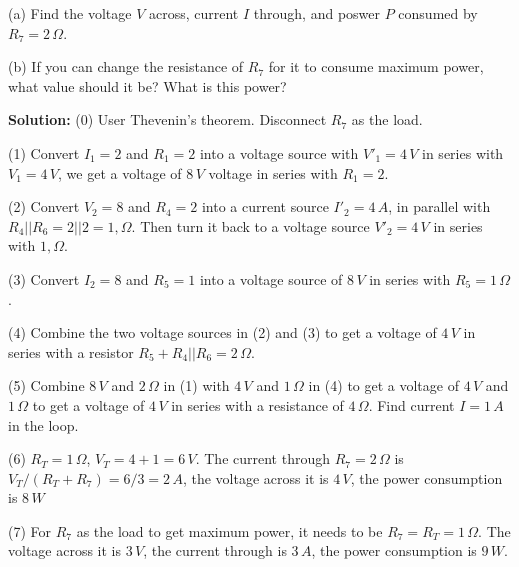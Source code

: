   (a) Find the voltage $V$ across, current $I$ through, and poswer
  $P$ consumed by $R_7=2\,\Omega$.
  

  (b) If you can change the resistance of $R_7$ for it to consume
  maximum power, what value should it be? What is this power?



  {\bf Solution:} 
  (0) User Thevenin's theorem. Disconnect $R_7$ as the load.

  (1) Convert $I_1=2$ and $R_1=2$ into a voltage source with $V'_1=4\,V$
  in series with $V_1=4\,V$, we get a voltage of $8\,V$ voltage in series 
  with $R_1=2$. 
  
  (2) Convert $V_2=8$ and $R_4=2$ into a current source $I'_2=4\,A$, in 
  parallel with $R_4||R_6=2||2=1,\Omega$. Then turn it back to a voltage 
  source $V'_2=4\,V$ in series with $1,\Omega$. 

  (3) Convert $I_2=8$ and $R_5=1$ into a voltage source of $8\,V$ in series
  with $R_5=1\,\Omega$.

  (4) Combine the two voltage sources in (2) and (3) to get a voltage of 
  $4\,V$ in series with a resistor $R_5+R_4||R_6=2\,\Omega$.

  (5) Combine $8\,V$ and $2\,\Omega$ in (1) with $4\,V$ and $1\,\Omega$ 
  in (4) to get a voltage of $4\,V$ and $1\,\Omega$ to get a voltage of 
  $4\,V$ in series with a resistance of $4\,\Omega$. Find current $I=1\,A$
  in the loop.

  (6) $R_T=1\,\Omega$, $V_T=4+1=6\,V$. The current through $R_7=2\,\Omega$
  is $V_T/(R_T+R_7)=6/3=2\,A$, the voltage across it is $4\,V$, the power
  consumption is $8\,W$

  (7) For $R_7$ as the load to get maximum power, it needs to be 
  $R_7=R_T=1\,\Omega$. The voltage across it is $3\,V$, the current 
  through is $3\,A$, the power consumption is $9\,W$.
